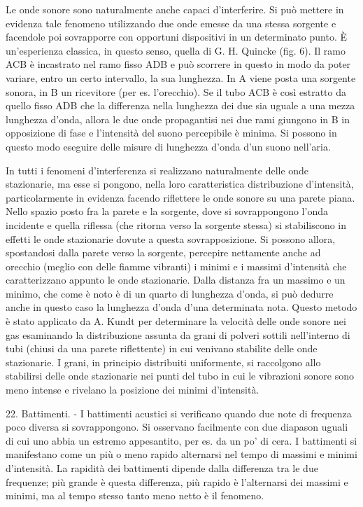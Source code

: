 \documentclass[a4paper]{article}
\begin{document}
Le onde sonore sono naturalmente anche capaci d'interferire. Si può mettere in evidenza tale fenomeno utilizzando due onde emesse da una stessa sorgente e facendole poi sovrapporre con opportuni dispositivi in un determinato punto. È un'esperienza classica, in questo senso, quella di G. H. Quincke (fig. 6). Il ramo ACB è incastrato nel ramo fisso ADB e può scorrere in questo in modo da poter variare, entro un certo intervallo, la sua lunghezza. In A viene posta una sorgente sonora, in B un ricevitore (per es. l'orecchio). Se il tubo ACB è così estratto da quello fisso ADB che la differenza nella lunghezza dei due sia uguale a una mezza lunghezza d'onda, allora le due onde propagantisi nei due rami giungono in B in opposizione di fase e l'intensità del suono percepibile è minima. Si possono in questo modo eseguire delle misure di lunghezza d'onda d'un suono nell'aria.

In tutti i fenomeni d'interferenza si realizzano naturalmente delle onde stazionarie, ma esse si pongono, nella loro caratteristica distribuzione d'intensità, particolarmente in evidenza facendo riflettere le onde sonore su una parete piana. Nello spazio posto fra la parete e la sorgente, dove si sovrappongono l'onda incidente e quella riflessa (che ritorna verso la sorgente stessa) si stabiliscono in effetti le onde stazionarie dovute a questa sovrapposizione. Si possono allora, spostandosi dalla parete verso la sorgente, percepire nettamente anche ad orecchio (meglio con delle fiamme vibranti) i minimi e i massimi d'intensità che caratterizzano appunto le onde stazionarie. Dalla distanza fra un massimo e un minimo, che come è noto è di un quarto di lunghezza d'onda, si può dedurre anche in questo caso la lunghezza d'onda d'una determinata nota. Questo metodo è stato applicato da A. Kundt per determinare la velocità delle onde sonore nei gas esaminando la distribuzione assunta da grani di polveri sottili nell'interno di tubi (chiusi da una parete riflettente) in cui venivano stabilite delle onde stazionarie. I grani, in principio distribuiti uniformente, si raccolgono allo stabilirsi delle onde stazionarie nei punti del tubo in cui le vibrazioni sonore sono meno intense e rivelano la posizione dei minimi d'intensità.

22. Battimenti. - I battimenti acustici si verificano quando due note di frequenza poco diversa si sovrappongono. Si osservano facilmente con due diapason uguali di cui uno abbia un estremo appesantito, per es. da un po' di cera. I battimenti si manifestano come un più o meno rapido alternarsi nel tempo di massimi e minimi d'intensità. La rapidità dei battimenti dipende dalla differenza tra le due frequenze; più grande è questa differenza, più rapido è l'alternarsi dei massimi e minimi, ma al tempo stesso tanto meno netto è il fenomeno.
\end{document}
